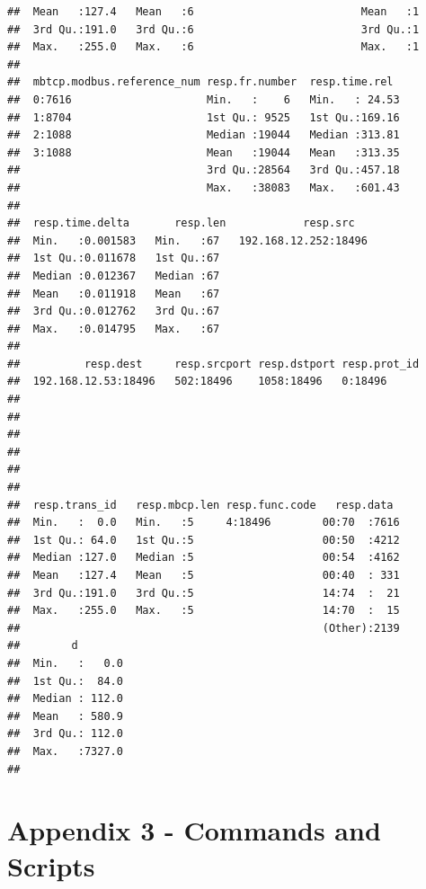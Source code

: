 \documentclass[]{article}
\begin{document}
\begin{verbatim}
##  Mean   :127.4   Mean   :6                          Mean   :1            
##  3rd Qu.:191.0   3rd Qu.:6                          3rd Qu.:1            
##  Max.   :255.0   Max.   :6                          Max.   :1            
##                                                                          
##  mbtcp.modbus.reference_num resp.fr.number  resp.time.rel   
##  0:7616                     Min.   :    6   Min.   : 24.53  
##  1:8704                     1st Qu.: 9525   1st Qu.:169.16  
##  2:1088                     Median :19044   Median :313.81  
##  3:1088                     Mean   :19044   Mean   :313.35  
##                             3rd Qu.:28564   3rd Qu.:457.18  
##                             Max.   :38083   Max.   :601.43  
##                                                             
##  resp.time.delta       resp.len            resp.src    
##  Min.   :0.001583   Min.   :67   192.168.12.252:18496  
##  1st Qu.:0.011678   1st Qu.:67                         
##  Median :0.012367   Median :67                         
##  Mean   :0.011918   Mean   :67                         
##  3rd Qu.:0.012762   3rd Qu.:67                         
##  Max.   :0.014795   Max.   :67                         
##                                                        
##          resp.dest     resp.srcport resp.dstport resp.prot_id
##  192.168.12.53:18496   502:18496    1058:18496   0:18496     
##                                                              
##                                                              
##                                                              
##                                                              
##                                                              
##                                                              
##  resp.trans_id   resp.mbcp.len resp.func.code   resp.data   
##  Min.   :  0.0   Min.   :5     4:18496        00:70  :7616  
##  1st Qu.: 64.0   1st Qu.:5                    00:50  :4212  
##  Median :127.0   Median :5                    00:54  :4162  
##  Mean   :127.4   Mean   :5                    00:40  : 331  
##  3rd Qu.:191.0   3rd Qu.:5                    14:74  :  21  
##  Max.   :255.0   Max.   :5                    14:70  :  15  
##                                               (Other):2139  
##        d         
##  Min.   :   0.0  
##  1st Qu.:  84.0  
##  Median : 112.0  
##  Mean   : 580.9  
##  3rd Qu.: 112.0  
##  Max.   :7327.0  
## 
\end{verbatim}

\section{Appendix 3 - Commands and
Scripts}\label{appendix-3---commands-and-scripts}
\end{document}
